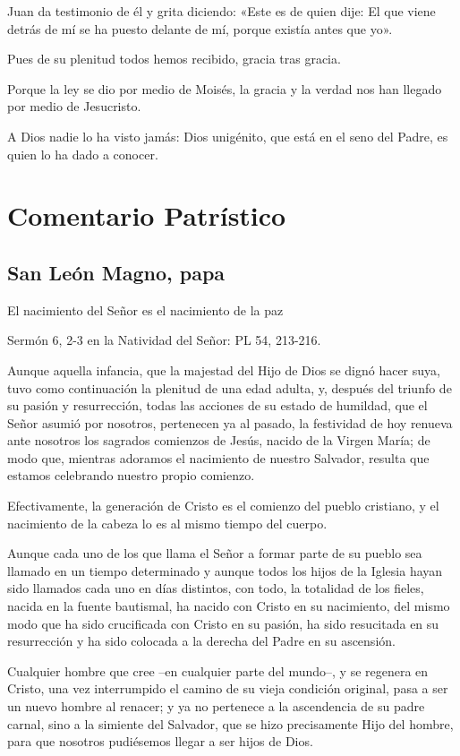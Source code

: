 \begin{body}
\begin{body}
Juan da testimonio de él y grita diciendo: «Este es de quien dije: El
que viene detrás de mí se ha puesto delante de mí, porque existía antes
que yo».

Pues de su plenitud todos hemos recibido, gracia tras gracia.

Porque la ley se dio por medio de Moisés, la gracia y la verdad nos han
llegado por medio de Jesucristo.

A Dios nadie lo ha visto jamás: Dios unigénito, que está en el seno del
Padre, es quien lo ha dado a conocer.

\section{Comentario Patrístico}

\subsection{San León Magno, papa}

El nacimiento del Señor es el nacimiento de la paz

Sermón 6, 2-3 en la Natividad del Señor: PL 54, 213-216.

Aunque aquella infancia, que la majestad del Hijo de Dios se dignó hacer suya, tuvo como continuación la plenitud de una edad adulta, y, después del triunfo de su pasión y resurrección, todas las acciones de su estado de humildad, que el Señor asumió por nosotros, pertenecen ya al pasado, la festividad de hoy renueva ante nosotros los sagrados comienzos de Jesús, nacido de la Virgen María; de modo que, mientras adoramos el nacimiento de nuestro Salvador, resulta que estamos celebrando nuestro propio comienzo.

Efectivamente, la generación de Cristo es el comienzo del pueblo cristiano, y el nacimiento de la cabeza lo es al mismo tiempo del cuerpo.

Aunque cada uno de los que llama el Señor a formar parte de su pueblo sea llamado en un tiempo determinado y aunque todos los hijos de la Iglesia hayan sido llamados cada uno en días distintos, con todo, la totalidad de los fieles, nacida en la fuente bautismal, ha nacido con Cristo en su nacimiento, del mismo modo que ha sido crucificada con Cristo en su pasión, ha sido resucitada en su resurrección y ha sido colocada a la derecha del Padre en su ascensión.

Cualquier hombre que cree --en cualquier parte del mundo--, y se regenera en Cristo, una vez interrumpido el camino de su vieja condición original, pasa a ser un nuevo hombre al renacer; y ya no pertenece a la ascendencia de su padre carnal, sino a la simiente del Salvador, que se hizo precisamente Hijo del hombre, para que nosotros pudiésemos llegar a ser hijos de Dios.


\end{body}
\end{body}
